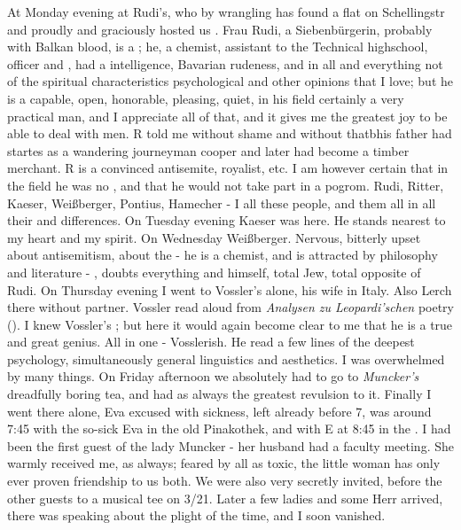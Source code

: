 \documentclass{article}
\begin{document}
At Monday evening at Rudi's, who by wrangling has found a flat on Schellingstr and proudly and graciously hosted us \skipped. Frau Rudi, a Siebenb\"urgerin, probably with Balkan blood, is a ; he, a chemist, assistant to the Technical highschool, officer and , had a  intelligence, Bavarian rudeness, and in all and everything not of the spiritual characteristics psychological and other opinions that I love; but he is a capable, open, honorable, pleasing, quiet, in his field certainly a very practical man, and I appreciate all of that, and it gives me the greatest joy to be able to deal with  men. R told me without shame and without  thatbhis father had startes as a wandering journeyman cooper and later had become a timber merchant. R is a convinced antisemite, royalist, etc. I am however certain that in the field he was no , and that he would not take part in a pogrom. Rudi, Ritter, Kaeser, Weißberger, Pontius, Hamecher - I  all these people, and  them all in all their  and differences. On Tuesday evening Kaeser was here. He stands nearest to my heart and my spirit. On Wednesday Weißberger. Nervous, bitterly upset about antisemitism, about the  - he is a chemist, and is attracted by philosophy and literature - , doubts everything and himself, total Jew, total opposite of Rudi. On Thursday evening I went to Vossler's alone, his wife in Italy. Also Lerch there without partner. Vossler read aloud from \textit{Analysen zu Leopardi'schen} poetry (). I knew Vossler's ; but here it would again become clear to me that he is a true and great genius.  All in one - Vosslerish. He read a few lines of the deepest psychology, simultaneously general linguistics and aesthetics. I was overwhelmed by many things.
On Friday afternoon we absolutely had to go to \textit{Muncker's} dreadfully boring tea, and had as always the greatest revulsion to it. Finally I went there alone, Eva excused with sickness, left already before 7, was around 7:45 with the so-sick Eva in the old Pinakothek, and with E at 8:45 in the . I had been the first guest of the lady Muncker - her husband had a faculty meeting. She warmly received me, as always; feared by all as toxic, the little woman has only ever proven friendship to us both. We were also very secretly invited, before the other guests to a musical tee on 3/21. Later a few ladies and some Herr arrived, there was speaking about the plight of the time, and I soon vanished.
\end{document}
